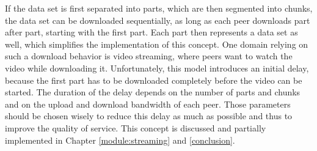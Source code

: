 If the data set is first separated into parts, which are then segmented into chunks, the data set can be downloaded sequentially, as long as each peer downloads part after part, starting with the first part. Each part then represents a data set as well, which simplifies the implementation of this concept. One domain relying on such a download behavior is video streaming, where peers want to watch the video while downloading it. Unfortunately, this model introduces an initial delay, because the first part has to be downloaded completely before the video can be started. The duration of the delay depends on the number of parts and chunks and on the upload and download bandwidth of each peer. Those parameters should be chosen wisely to reduce this delay as much as possible and thus to improve the quality of service. This concept is discussed and partially implemented in Chapter \ref{module:streaming} and \ref{conclusion}.

